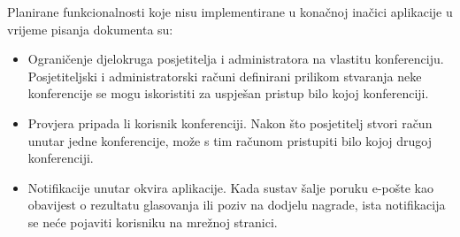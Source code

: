 		 Planirane funkcionalnosti koje nisu implementirane u konačnoj inačici aplikacije u vrijeme pisanja dokumenta su:
		 \begin{itemize}
		 	\item Ograničenje djelokruga posjetitelja i administratora na vlastitu konferenciju. Posjetiteljski i administratorski računi definirani prilikom stvaranja neke konferencije se mogu iskoristiti za uspješan pristup bilo kojoj konferenciji.
		 	\item Provjera pripada li korisnik konferenciji. Nakon što posjetitelj stvori račun unutar jedne konferencije, može s tim računom pristupiti bilo kojoj drugoj konferenciji.
		 	\item Notifikacije unutar okvira aplikacije. Kada sustav šalje poruku e-pošte kao obavijest o rezultatu glasovanja ili poziv na dodjelu nagrade, ista notifikacija se neće pojaviti korisniku na mrežnoj stranici.
		 \end{itemize}
		
		\eject 